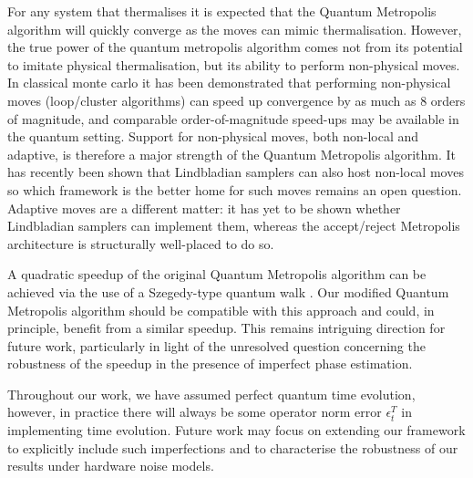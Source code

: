 \documentclass[aps,floatfix,10pt,amssymb,amsfont,amsmath,superscriptaddress,float,nofootinbib,longbibliography,nobalancelastpage,twocolumn]{revtex4-2}
\begin{document}
For any system that thermalises it is expected that the Quantum Metropolis algorithm will quickly converge as the moves can mimic thermalisation. However, the true power of the quantum metropolis algorithm comes not from its potential to imitate physical thermalisation, but its ability to perform non-physical moves. In classical monte carlo it has been demonstrated \cite{blote2002cluster,todo2019parallel} that performing non-physical moves (loop/cluster algorithms) can speed up convergence by as much as 8 orders of magnitude, and comparable order-of-magnitude speed-ups may be available in the quantum setting. Support for non-physical moves, both non-local and adaptive, is therefore a major strength of the Quantum Metropolis algorithm. It has recently been shown that Lindbladian samplers can also host non-local moves \cite{chen2025efficient} so which framework is the better home for such moves remains an open question. Adaptive moves are a different matter: it has yet to be shown whether Lindbladian samplers can implement them, whereas the accept/reject Metropolis architecture is structurally well-placed to do so.

A quadratic speedup \cite{yung2012quantum} of the original Quantum Metropolis algorithm can be achieved via the use of a Szegedy-type quantum walk \cite{szegedy2004quantum}. Our modified Quantum Metropolis algorithm should be compatible with this approach and could, in principle, benefit from a similar speedup. This remains intriguing direction for future work, particularly in light of the unresolved question concerning the robustness of the speedup in the presence of imperfect phase estimation. 

Throughout our work, we have assumed perfect quantum time evolution, however, in practice there will always be some operator norm error $\epsilon^T_t$ in implementing time evolution. Future work may focus on extending our framework to explicitly include such imperfections and to characterise the robustness of our results under hardware noise models.



\appendix
\onecolumngrid    
\end{document}
